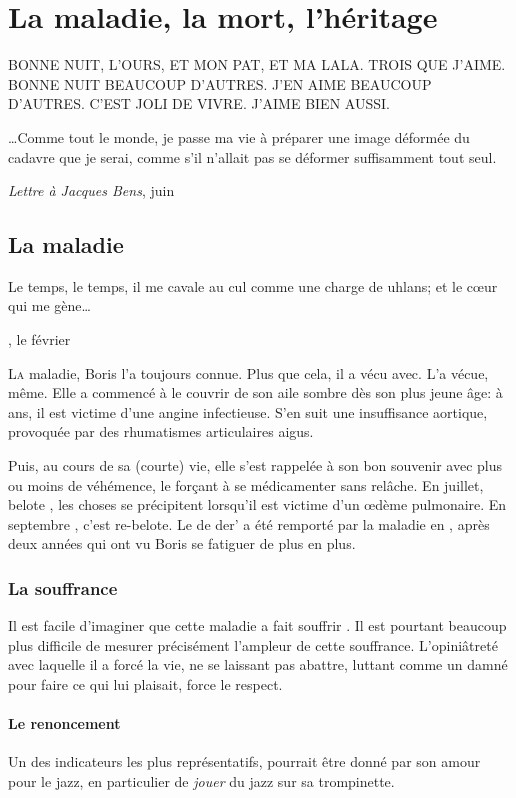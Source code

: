 \chapter{La maladie, la mort, l'héritage}
\epigraph{BONNE NUIT, L'OURS, ET MON PAT, ET MA LALA. TROIS QUE J'AIME. BONNE NUIT BEAUCOUP D'AUTRES. J'EN AIME BEAUCOUP D'AUTRES. C'EST JOLI DE VIVRE. J'AIME BIEN AUSSI.}
{\BV}
\epigraph{\ldots Comme tout le monde, je passe ma vie à préparer une image déformée du cadavre
que je serai, comme s'il n'allait pas se déformer suffisamment tout seul.}
{\emph{Lettre à Jacques Bens},  juin }
\vfill
\pagebreak
\section{La maladie}
\epigraph{Le temps, le temps, il me cavale au cul comme une charge de uhlans; et le c\oe{}ur qui me gène\ldots}
{\BV, le  février }

\lettrine{L}a maladie, Boris l'a toujours connue. Plus que cela, il a vécu avec. L'a vécue, même.
Elle a commencé à le couvrir de son aile sombre dès son plus jeune âge: à  ans, il
est victime d'une angine infectieuse. S'en suit une insuffisance aortique, provoquée 
par des rhumatismes articulaires aigus.

Puis, au cours de sa (courte) vie, elle s'est rappelée à son bon souvenir
avec plus ou moins de véhémence, le forçant à se médicamenter sans relâche. En juillet, belote ,
les choses se précipitent lorsqu'il est victime d'un \oe{}dème pulmonaire.
En septembre , c'est re-belote. Le  de der' a été remporté par la maladie
en , après deux années qui ont vu Boris se fatiguer de plus en plus.

\subsection{La souffrance}
Il est facile d'imaginer que cette maladie a fait souffrir \BV. Il est
pourtant beaucoup plus difficile de mesurer précisément l'ampleur de
cette souffrance. L'opiniâtreté avec laquelle il a forcé la vie, ne se laissant
pas abattre, luttant comme un damné pour faire ce qui lui plaisait, force le respect.

\subsubsection{Le renoncement}
Un des indicateurs les plus représentatifs, pourrait être donné par son amour
pour le jazz, en particulier de \emph{jouer} du jazz sur sa trompinette.

